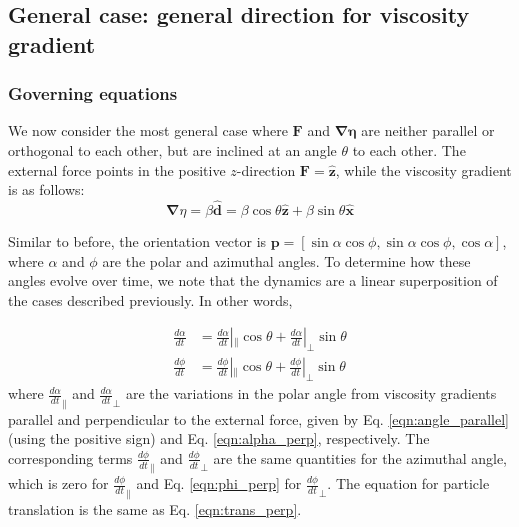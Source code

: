 \documentclass{jfm}
\begin{document}
\subsection{General case:  general direction for viscosity gradient}
\subsubsection{Governing equations}
We now consider the most general case where $\boldsymbol{F}$ and $\boldsymbol{\nabla}\mathbf{\eta}$ are neither parallel or orthogonal to each other, but are inclined at an angle $\theta$ to each other. The external force points in the positive $z$-direction $\boldsymbol{F} = \hat{\boldsymbol{z}}$, while the viscosity gradient is as follows:
\begin{equation}
\boldsymbol{\nabla}\eta = \beta \boldsymbol{\hat{d}} = \beta \cos \theta \boldsymbol{\hat{z}} + \beta \sin \theta \boldsymbol{\hat{x}}
\end{equation}

Similar to before, the orientation vector is $\boldsymbol{p} = [\sin \alpha \cos\phi, \sin\alpha \cos\phi, \cos\alpha]$, where $\alpha$ and $\phi$ are the polar and azimuthal angles.  To determine how these angles evolve over time, we note that the dynamics are a linear superposition of the cases described previously.  In other words,

\begin{subequations}
\begin{align} \label{eqn:angle_general}
\frac{d \alpha}{d t} &= \frac{d \alpha}{d t}|_{\parallel} \cos \theta +  \frac{d \alpha}{d t}|_{\perp} \sin \theta \\
\frac{d \phi}{d t} &= \frac{d \phi}{d t}|_{\parallel} \cos \theta +  \frac{d \phi}{d t}|_{\perp} \sin \theta
\end{align}    
\end{subequations}
where $\frac{d \alpha}{d t}_{\parallel}$ and $\frac{d \alpha}{d t}_{\perp}$ are the variations in the polar angle from viscosity gradients parallel and perpendicular to the external force, given by Eq. \eqref{eqn:angle_parallel} (using the positive sign) and Eq. \eqref{eqn:alpha_perp}, respectively.  The corresponding terms $\frac{d \phi}{d t}_{\parallel}$ and $\frac{d \phi}{d t}_{\perp}$ are the same quantities for the azimuthal angle, which is zero for $\frac{d \phi}{d t}_{\parallel}$ and Eq. \eqref{eqn:phi_perp} for $\frac{d \phi}{d t}_{\perp}$.  The equation for particle translation is the same as Eq. \eqref{eqn:trans_perp}.  
\end{document}
